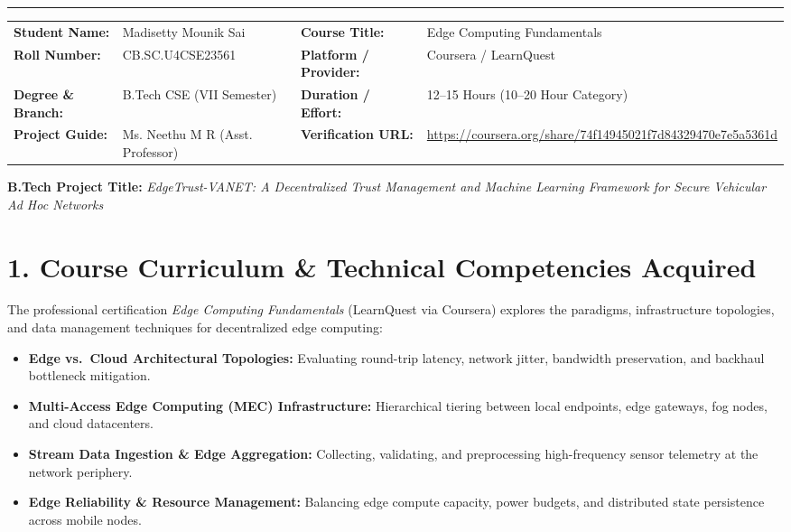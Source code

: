 \documentclass[10pt,a4paper]{article}
\begin{document}
\vspace{-4pt}
\hrule height 0.8pt
\vspace{4pt}

\noindent
\begin{tabularx}{\textwidth}{@{}l X l X@{}}
    \textbf{Student Name:} & Madisetty Mounik Sai & \textbf{Course Title:} & Edge Computing Fundamentals \\
    \textbf{Roll Number:} & CB.SC.U4CSE23561 & \textbf{Platform / Provider:} & Coursera / LearnQuest \\
    \textbf{Degree \& Branch:} & B.Tech CSE (VII Semester) & \textbf{Duration / Effort:} & 12--15 Hours (10--20 Hour Category) \\
    \textbf{Project Guide:} & Ms. Neethu M R (Asst. Professor) & \textbf{Verification URL:} & \url{https://coursera.org/share/74f14945021f7d84329470e7e5a5361d} \\
\end{tabularx}

\vspace{3pt}
\noindent
\textbf{B.Tech Project Title:} \textit{EdgeTrust-VANET: A Decentralized Trust Management and Machine Learning Framework for Secure Vehicular Ad Hoc Networks}

\vspace{2pt}
\section*{1. Course Curriculum \& Technical Competencies Acquired}
The professional certification \textit{Edge Computing Fundamentals} (LearnQuest via Coursera) explores the paradigms, infrastructure topologies, and data management techniques for decentralized edge computing:
\begin{itemize}
    \item \textbf{Edge vs.\ Cloud Architectural Topologies:} Evaluating round-trip latency, network jitter, bandwidth preservation, and backhaul bottleneck mitigation.
    \item \textbf{Multi-Access Edge Computing (MEC) Infrastructure:} Hierarchical tiering between local endpoints, edge gateways, fog nodes, and cloud datacenters.
    \item \textbf{Stream Data Ingestion \& Edge Aggregation:} Collecting, validating, and preprocessing high-frequency sensor telemetry at the network periphery.
    \item \textbf{Edge Reliability \& Resource Management:} Balancing edge compute capacity, power budgets, and distributed state persistence across mobile nodes.
\end{itemize}
\end{document}
